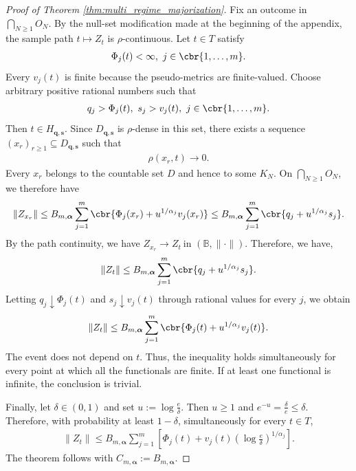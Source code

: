 \documentclass[11pt]{article}
\begin{document}
\begin{proof}[Proof of Theorem \ref{thm:multi_regime_majorization}]
Fix an outcome in $\bigcap_{N\ge1}O_N$. By the null-set modification
made at the beginning of the appendix, the sample path
$t\mapsto Z_t$ is $\rho$-continuous. Let $t\in T$ satisfy
\begin{align*}
\Phi_j(t)<\infty,
\ j\in\cbr{1,\ldots,m}.
\end{align*}
Every $v_j(t)$ is finite because the pseudo-metrics are finite-valued.
Choose arbitrary positive rational numbers such that
\begin{align*}
q_j>\Phi_j(t),
\ 
s_j>v_j(t),
\ j\in\cbr{1,\ldots,m}.
\end{align*}
Then $t\in H_{\boldsymbol q,\boldsymbol s}$. Since
$D_{\boldsymbol q,\boldsymbol s}$ is $\rho$-dense in this set, there
exists a sequence $(x_r)_{r\ge1}
\subseteq
D_{\boldsymbol q,\boldsymbol s}$ such that
\begin{align*}
\rho(x_r,t)
\rightarrow
0.
\end{align*}
Every $x_r$ belongs to the countable set $D$ and hence to some
$K_N$. On $\bigcap_{N\ge1}O_N$, we therefore have
\begin{align*}
\|Z_{x_r}\|
\le
B_{m,\boldsymbol\alpha}
\sum_{j=1}^m
\cbr{
\Phi_j(x_r)+u^{1/\alpha_j}v_j(x_r)
}\le
B_{m,\boldsymbol\alpha}
\sum_{j=1}^m
\cbr{
q_j+u^{1/\alpha_j}s_j
}.
\end{align*}
By the path continuity, we have
$Z_{x_r}
\rightarrow
Z_t
\ \text{in }(\mathbb B,\|\cdot\|)$. Therefore, we have,
\begin{align*}
\|Z_t\|
\le
B_{m,\boldsymbol\alpha}
\sum_{j=1}^m
\cbr{
q_j+u^{1/\alpha_j}s_j
}.
\end{align*}
Letting $q_j\downarrow\Phi_j(t)$ and
$s_j\downarrow v_j(t)$ through rational values for every $j$, we
obtain
\begin{align*}
\|Z_t\|
\le
B_{m,\boldsymbol\alpha}
\sum_{j=1}^m
\cbr{
\Phi_j(t)+u^{1/\alpha_j}v_j(t)
}.
\end{align*}
The event does not depend on $t$. Thus, the inequality holds
simultaneously for every point at which all the functionals are finite.
If at least one functional is infinite, the conclusion is trivial.

Finally, let $\delta\in(0,1)$ and set $u
:=
\log\frac{e}{\delta}$. Then $u\ge1$ and $e^{-u}
=
\frac{\delta}{e}
\le
\delta$.
Therefore, with probability at least $1-\delta$, simultaneously for
every $t\in T$,
\begin{align*}
\|Z_t\|
\le
B_{m,\boldsymbol\alpha}
\sum_{j=1}^m
\left[
\Phi_j(t)
+
v_j(t)
\left(
\log\frac{e}{\delta}
\right)^{1/\alpha_j}
\right].
\end{align*}
The theorem follows with
$C_{m,\boldsymbol\alpha}:=B_{m,\boldsymbol\alpha}$.
\end{proof}
\end{document}
